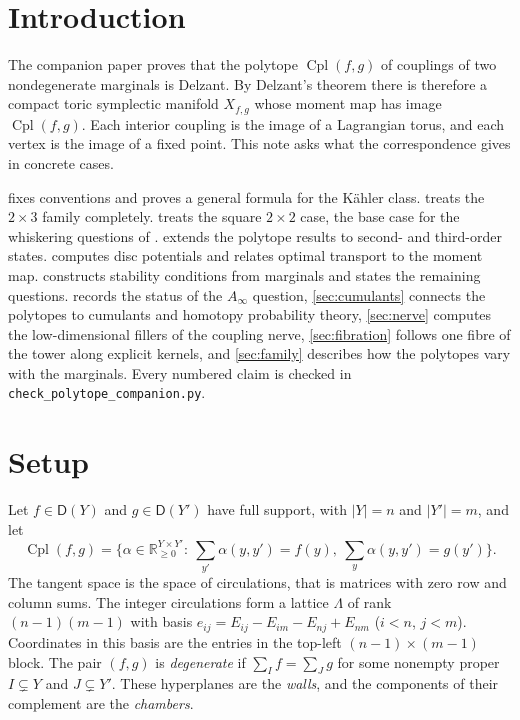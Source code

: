 \documentclass[11pt]{article}
\theoremstyle{definition}
\theoremstyle{remark}
\newcommand{\D}{\mathsf{D}}
\newcommand{\Cpl}{\operatorname{Cpl}}
\begin{document}
\tableofcontents

\section{Introduction}\label{sec:intro}

The companion paper \cite{Conditionals} proves that the polytope $\Cpl(f,g)$ of couplings of two
nondegenerate marginals is Delzant. By Delzant's theorem \cite{Delzant1988} there is therefore a
compact toric symplectic manifold $X_{f,g}$ whose moment map has image $\Cpl(f,g)$. Each interior
coupling is the image of a Lagrangian torus, and each vertex is the image of a fixed point. This note
asks what the correspondence gives in concrete cases.

 fixes conventions and proves a general formula for the Kähler class.
 treats the $2\times3$ family completely.  treats the square $2\times2$
case, the base case for the whiskering questions of \cite[\S\S5, 9]{Conditionals}. 
extends the polytope results to second- and third-order states.  computes disc
potentials and relates optimal transport to the moment map.  constructs stability
conditions from marginals and states the remaining questions.  records the status of
the $A_\infty$ question, \cref{sec:cumulants} connects the polytopes to cumulants and homotopy probability
theory, \cref{sec:nerve} computes the low-dimensional fillers of the coupling nerve, \cref{sec:fibration} follows one
fibre of the tower along explicit kernels, and \cref{sec:family} describes how the polytopes vary with the
marginals. Every numbered claim is checked in \texttt{check\_polytope\_companion.py}.

\section{Setup}\label{sec:setup}

Let $f\in\D(Y)$ and $g\in\D(Y')$ have full support, with $\lvert Y\rvert=n$ and $\lvert Y'\rvert=m$, and
let
\[
\Cpl(f,g)=\Big\{\alpha\in\mathbb{R}_{\ge0}^{Y\times Y'}:\ \textstyle\sum_{y'}\alpha(y,y')=f(y),\
\sum_y\alpha(y,y')=g(y')\Big\}.
\]
The tangent space is the space of circulations, that is matrices with zero row and column sums. The
integer circulations form a lattice $\Lambda$ of rank $(n-1)(m-1)$ with basis
$e_{ij}=E_{ij}-E_{im}-E_{nj}+E_{nm}$ ($i<n$, $j<m$). Coordinates in this basis are the entries in the
top-left $(n-1)\times(m-1)$ block. The pair $(f,g)$ is \emph{degenerate} if $\sum_If=\sum_Jg$ for some
nonempty proper $I\subsetneq Y$ and $J\subsetneq Y'$. These hyperplanes are the \emph{walls}, and the
components of their complement are the \emph{chambers}.
\end{document}
